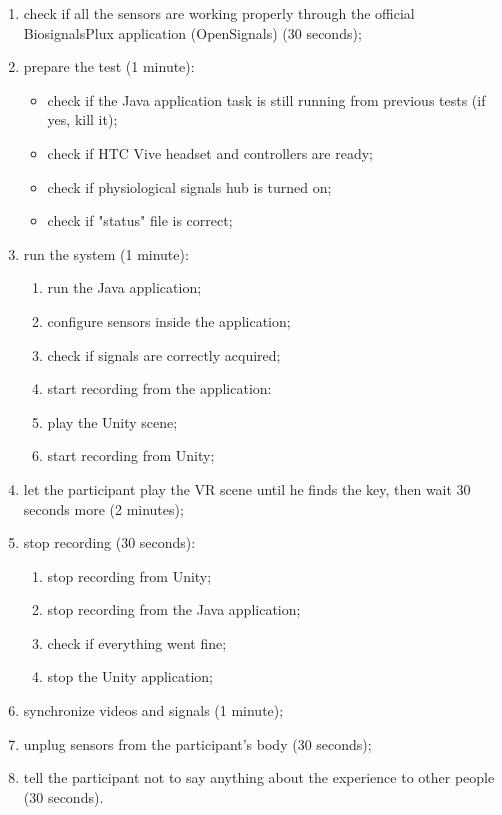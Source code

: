 \documentclass[binding=0.6cm,LaM]{sapthesis}
\begin{document}
\begin{enumerate}
\item check if all the sensors are working properly through the official BiosignalsPlux application (OpenSignals) (30 seconds);

\item prepare the test (1 minute): 
\begin{itemize}
\item check if the Java application task is still running from previous tests (if yes, kill it);
\item check if HTC Vive headset and controllers are ready;
\item check if physiological signals hub is turned on;
\item check if "status" file is correct;
\end{itemize}

\item run the system (1 minute):
\begin{enumerate}
\item run the Java application;
\item configure sensors inside the application;
\item check if signals are correctly acquired;
\item start recording from the application:
\item play the Unity scene;
\item start recording from Unity;
\end{enumerate}

\item let the participant play the VR scene until he finds the key, then wait 30 seconds more (2 minutes);

\item stop recording (30 seconds):
\begin{enumerate}
\item stop recording from Unity; 
\item stop recording from the Java application;
\item check if everything went fine;
\item stop the Unity application;
\end{enumerate}

\item synchronize videos and signals (1 minute);

\item unplug sensors from the participant's body (30 seconds);

\item tell the participant not to say anything about the experience to other people (30 seconds).

\end{enumerate}
\end{document}
